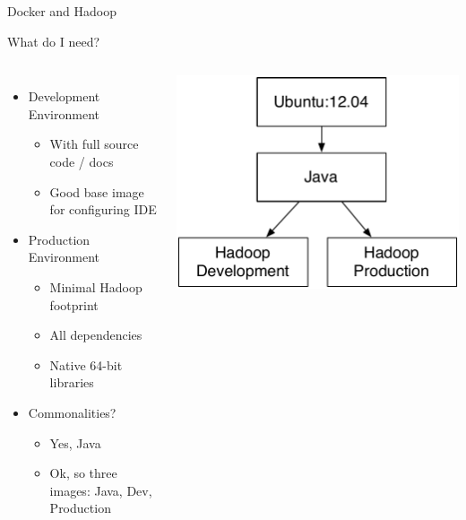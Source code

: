 \documentclass[xcolor=dvipsnames]{beamer}
\newcommand{\cpause}{}
\begin{document}
\begin{frame}{Docker and Hadoop}

  What do I need? \cpause

  \begin{columns}
  \begin{itemize}
  \item Development Environment
    \begin{itemize}
    \item With full source code / docs \cpause
    \item Good base image for configuring IDE \cpause
    \end{itemize}
  \item Production Environment \cpause
    \begin{itemize}
    \item Minimal Hadoop footprint \cpause
    \item All dependencies \cpause
    \item Native 64-bit libraries \cpause
    \end{itemize}
  \item Commonalities? \cpause
    \begin{itemize}
    \item Yes, Java \cpause
    \item Ok, so three images: Java, Dev, Production \cpause
    \end{itemize}
  \end{itemize}

  \includegraphics[width=\textwidth]{figures/hadoop-images.pdf}
  \end{columns}

\end{frame}
\end{document}

